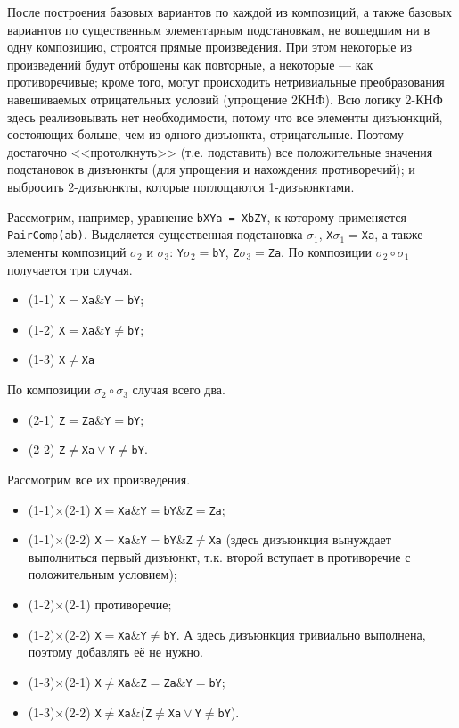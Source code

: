 \documentclass[12pt]{article}
\def\logand{\mathrel{\&}}
\def\logor{\mathrel{\vee}}
\begin{document}
После построения базовых вариантов по каждой из композиций, а также базовых вариантов по существенным элементарным подстановкам, не вошедшим ни в одну композицию, строятся прямые произведения. При этом некоторые из произведений будут отброшены как повторные, а некоторые --- как противоречивые; кроме того, могут происходить нетривиальные преобразования навешиваемых отрицательных условий (упрощение 2КНФ). Всю логику 2-КНФ здесь реализовывать нет необходимости, потому что все элементы дизъюнкций, состояющих больше, чем из одного дизъюнкта, отрицательные. Поэтому достаточно <<протолкнуть>> (т.е. подставить) все положительные значения подстановок в дизъюнкты (для упрощения и нахождения противоречий); и выбросить 2-дизъюнкты, которые поглощаются 1-дизъюнктами.

Рассмотрим, например, уравнение \verb|bXYa = XbZY|, к которому применяется \verb|PairComp(ab)|. Выделяется существенная подстановка $\sigma_1$, \verb|X|$\sigma_1=$\verb|Xa|, а также элементы композиций $\sigma_2$ и $\sigma_3$: \verb|Y|$\sigma_2=$\verb|bY|, \verb|Z|$\sigma_3=$\verb|Za|. По композиции $\sigma_2\circ\sigma_1$ получается три случая.

\begin{itemize}
\item (1-1) \verb|X|$=$\verb|Xa|$\logand$\verb|Y|$=$\verb|bY|;
\item (1-2) \verb|X|$=$\verb|Xa|$\logand$\verb|Y|$\neq$\verb|bY|;
\item (1-3) \verb|X|$\neq$\verb|Xa|
\end{itemize}  
 
По композиции $\sigma_2\circ\sigma_3$ случая всего два.

\begin{itemize}
\item (2-1) \verb|Z|$=$\verb|Za|$\logand$\verb|Y|$=$\verb|bY|;
\item (2-2) \verb|Z|$\neq$\verb|Xa|$\logor$\verb|Y|$\neq$\verb|bY|.
\end{itemize}  
 
Рассмотрим все их произведения. 

\begin{itemize}
\item (1-1)$\times$(2-1) \verb|X|$=$\verb|Xa|$\logand$\verb|Y|$=$\verb|bY|$\logand$\verb|Z|$=$\verb|Za|;
\item (1-1)$\times$(2-2) \verb|X|$=$\verb|Xa|$\logand$\verb|Y|$=$\verb|bY|$\logand$\verb|Z|$\neq$\verb|Xa| (здесь дизъюнкция вынуждает выполниться первый дизъюнкт, т.к. второй вступает в противоречие с положительным условием);
\item (1-2)$\times$(2-1) противоречие;
\item (1-2)$\times$(2-2) \verb|X|$=$\verb|Xa|$\logand$\verb|Y|$\neq$\verb|bY|. А здесь дизъюнкция тривиально выполнена, поэтому добавлять её не нужно.
\item (1-3)$\times$(2-1) \verb|X|$\neq$\verb|Xa|$\logand$\verb|Z|$=$\verb|Za|$\logand$\verb|Y|$=$\verb|bY|;
\item (1-3)$\times$(2-2) \verb|X|$\neq$\verb|Xa|$\logand$(\verb|Z|$\neq$\verb|Xa|$\logor$\verb|Y|$\neq$\verb|bY|).
\end{itemize}  
\end{document}
